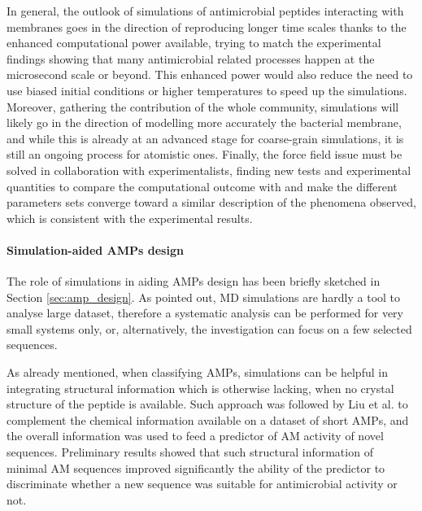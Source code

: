In general, the outlook of simulations of antimicrobial peptides interacting with membranes goes in the direction of reproducing longer time scales thanks to the enhanced computational power available, trying to match the experimental findings showing that many antimicrobial related processes happen at the microsecond scale or beyond.
%
This enhanced power would also reduce the need to use biased initial conditions or higher temperatures to speed up the simulations.
%
Moreover, gathering the contribution of the whole community, simulations will likely go in the direction of modelling more accurately the bacterial membrane, and while this is already at an advanced stage for coarse-grain simulations, it is still an ongoing process for atomistic ones.
%
Finally, the force field issue must be solved in collaboration with experimentalists, finding new tests and experimental quantities to compare the computational outcome with and make the different parameters sets converge toward a similar description of the phenomena observed, which is consistent with the experimental results.


\paragraph{Simulation-aided AMPs design}

The role of simulations in aiding AMPs design has been briefly sketched in Section \ref{sec:amp_design}. As pointed out, MD simulations are hardly a tool to analyse large dataset, therefore a systematic analysis can be performed for very small systems only, or, alternatively, the investigation can focus on a few selected sequences.

As already mentioned, when classifying AMPs, simulations can be helpful in integrating structural information which is otherwise lacking, when no crystal structure of the peptide is available. Such approach was followed by Liu et al. \cite{Liu2018} to complement the chemical information available on a dataset of short AMPs, and the overall information was used to feed a predictor of AM activity of novel sequences. Preliminary results showed that such structural information of minimal AM sequences improved significantly the ability of the predictor to discriminate whether a new sequence was suitable for antimicrobial activity or not.

